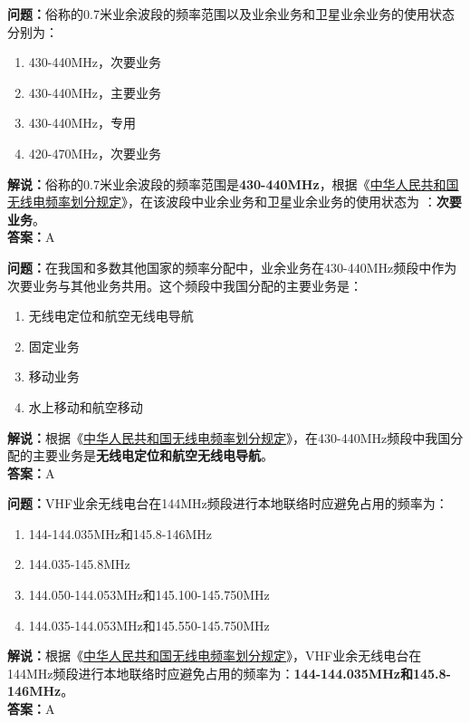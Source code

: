 \textbf{问题：}俗称的0.7米业余波段的频率范围以及业余业务和卫星业余业务的使用状态分别为：
\begin{enumerate}[label=\Alph*), leftmargin=1cm]
  \item 430-440MHz，次要业务
  \item 430-440MHz，主要业务
  \item 430-440MHz，专用
  \item 420-470MHz，次要业务
\end{enumerate}
\textbf{解说：}俗称的0.7米业余波段的频率范围是\textbf{430-440MHz}，根据《\href{https://www.miit.gov.cn/zwgk/zcwj/wjfb/txy/art/2020/art_066386284cd2449493586c81ccafed11.html}{中华人民共和国无线电频率划分规定}》，在该波段中业余业务和卫星业余业务的使用状态为 ：\textbf{次要业务}。\\\textbf{答案：}A

\textbf{问题：}在我国和多数其他国家的频率分配中，业余业务在430-440MHz频段中作为次要业务与其他业务共用。这个频段中我国分配的主要业务是：
\begin{enumerate}[label=\Alph*), leftmargin=1cm]
  \item 无线电定位和航空无线电导航
  \item 固定业务
  \item 移动业务
  \item 水上移动和航空移动
\end{enumerate}
\textbf{解说：}根据《\href{https://www.miit.gov.cn/zwgk/zcwj/wjfb/txy/art/2020/art_066386284cd2449493586c81ccafed11.html}{中华人民共和国无线电频率划分规定}》，在430-440MHz频段中我国分配的主要业务是\textbf{无线电定位和航空无线电导航}。\\\textbf{答案：}A

\textbf{问题：}VHF业余无线电台在144MHz频段进行本地联络时应避免占用的频率为：
\begin{enumerate}[label=\Alph*), leftmargin=1cm]
  \item 144-144.035MHz和145.8-146MHz
  \item 144.035-145.8MHz
  \item 144.050-144.053MHz和145.100-145.750MHz
  \item 144.035-144.053MHz和145.550-145.750MHz
\end{enumerate}
\textbf{解说：}根据《\href{https://www.miit.gov.cn/zwgk/zcwj/wjfb/txy/art/2020/art_066386284cd2449493586c81ccafed11.html}{中华人民共和国无线电频率划分规定}》，VHF业余无线电台在144MHz频段进行本地联络时应避免占用的频率为：\textbf{144-144.035MHz和145.8-146MHz}。\\\textbf{答案：}A%

